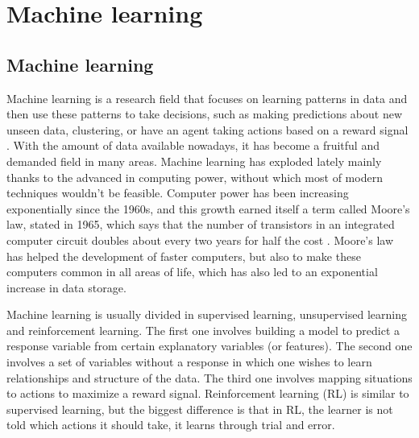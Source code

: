 
\chapter{Machine learning}
\label{ch:machine_learning}




\section{Machine learning}

Machine learning is a research field that focuses on learning patterns in data and then use these patterns to take decisions, such as making predictions about new unseen data,  clustering, or have an agent taking actions based on a reward signal \cite{murphy2012machine} \cite{sutton1998reinforcement}. With the amount of data available nowadays, it has become a fruitful and demanded field in many areas. Machine learning has exploded lately mainly thanks to the advanced in computing power, without which most of modern techniques wouldn't be feasible. Computer power has been increasing exponentially since the 1960s, and this growth earned itself a term called Moore's law, stated in 1965, which says that the number of transistors in an integrated computer circuit doubles about every two years for half the cost \cite{moore2006cramming} \cite{moore1975progress}. Moore's law has helped the development of faster computers, but also to make these computers common in all areas of life, which has also led to an exponential increase in data storage.

Machine learning is usually divided in supervised learning, unsupervised learning and reinforcement learning. The first one involves building a model to predict a response variable from certain explanatory variables (or features). The second one involves a set of variables without a response in which one wishes to learn relationships and structure of the data. The third one involves mapping situations to actions to maximize a reward signal. Reinforcement learning (RL) is similar to supervised learning, but the biggest difference is that in RL, the learner is not told which actions it should take, it learns through trial and error.

